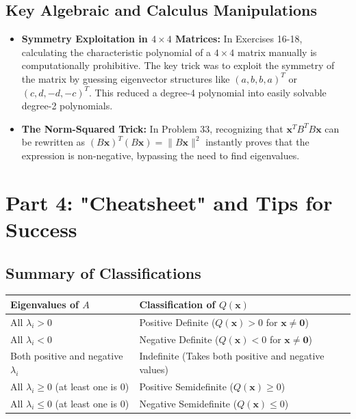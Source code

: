 \documentclass[11pt, letterpaper]{article}
\theoremstyle{definition}
\theoremstyle{remark}
\newcommand{\x}{\mathbf{x}}
\begin{document}
\subsection{Key Algebraic and Calculus Manipulations}
\begin{itemize}
    \item \textbf{Symmetry Exploitation in $4 \times 4$ Matrices:} In Exercises 16-18, calculating the characteristic polynomial of a $4 \times 4$ matrix manually is computationally prohibitive. The key trick was to exploit the symmetry of the matrix by guessing eigenvector structures like $(a, b, b, a)^T$ or $(c, d, -d, -c)^T$. This reduced a degree-4 polynomial into easily solvable degree-2 polynomials.
    \item \textbf{The Norm-Squared Trick:} In Problem 33, recognizing that $\x^T B^T B \x$ can be rewritten as $(B\x)^T (B\x) = \|B\x\|^2$ instantly proves that the expression is non-negative, bypassing the need to find eigenvalues.
\end{itemize}

\newpage

\section{Part 4: "Cheatsheet" and Tips for Success}

\subsection{Summary of Classifications}
\renewcommand{\arraystretch}{1.5}
\begin{tabularx}{\textwidth}{>{\raggedright\arraybackslash}X >{\raggedright\arraybackslash}X}
\toprule
\textbf{Eigenvalues of $A$} & \textbf{Classification of $Q(\x)$} \\
\midrule
All $\lambda_i > 0$ & Positive Definite ($Q(\x) > 0$ for $\x \neq \mathbf{0}$) \\
All $\lambda_i < 0$ & Negative Definite ($Q(\x) < 0$ for $\x \neq \mathbf{0}$) \\
Both positive and negative $\lambda_i$ & Indefinite (Takes both positive and negative values) \\
All $\lambda_i \ge 0$ (at least one is 0) & Positive Semidefinite ($Q(\x) \ge 0$) \\
All $\lambda_i \le 0$ (at least one is 0) & Negative Semidefinite ($Q(\x) \le 0$) \\
\bottomrule
\end{tabularx}
\end{document}
